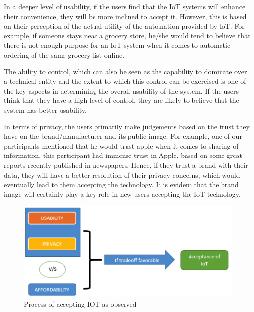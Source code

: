 In a deeper level of usability, if the users find that the IoT systems will enhance their convenience, they will be more inclined to accept it. However, this is based on their perception of the actual utility of the automation provided by IoT. For example, if someone stays near a grocery store, he/she would tend to believe that there is not enough purpose for an IoT system when it comes to automatic ordering of the same grocery list online. 

The ability to control, which can also be seen as the capability to dominate over a technical entity and the extent to which this control can be exercised is one of the key aspects in determining the overall usability of the system. If the users think that they have a high level of control, they are likely to believe that the system has better usability.

In terms of privacy, the users primarily make judgements based on the trust they have on the brand/manufacturer and its public image. For example, one of our participants mentioned that he would trust apple when it comes to sharing of information, this participant had immense trust in Apple, based on some great reports recently published in newspapers. Hence, if they trust a brand with their data, they will have a better resolution of their privacy concerns, which would eventually lead to them accepting the technology. It is evident that the brand image will certainly play a key role in new users accepting the IoT technology.


\begin{figure}
	\centering
	\includegraphics[width=0.6\columnwidth]{figures/AcceptingProcess.png}
	\caption{Process of accepting IOT as observed}
	\label{fig:AcceptingProcess}
\end{figure}

